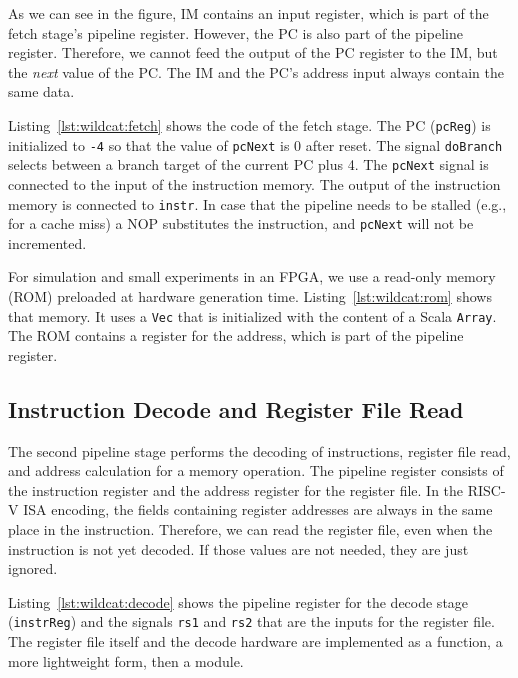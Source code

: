 \documentclass[%
    10pt,
    headinclude, footexclude,
    openright, %
    notitlepage,
    cleardoubleempty,
    headsepline,
    pointlessnumbers,
    bibtotoc, idxtotoc,
    ]{scrbook}
\newcommand{\code}[1]{{\lstinline[basicstyle=\small\ttfamily]{#1}}}
\begin{document}
As we can see in the figure, IM contains an input register, which is part of the fetch
stage's pipeline register. However, the PC is also part of the pipeline
register. Therefore, we cannot feed the output of the PC register to the IM,
but the \emph{next} value of the PC. The IM and the PC's address input always
contain the same data.


Listing~\ref{lst:wildcat:fetch} shows the code of the fetch stage. The PC (\code{pcReg})
is initialized to \code{-4} so that the value of \code{pcNext} is 0 after reset.
The signal \code{doBranch} selects between a branch target of the current PC plus 4.
The \code{pcNext} signal is connected to the input of the instruction memory.
The output of the instruction memory is connected to \code{instr}.
In case that the pipeline needs to be stalled (e.g., for a cache miss)
a NOP substitutes the instruction, and \code{pcNext} will not be incremented.


For simulation and small experiments in an FPGA, we use a read-only memory (ROM)
preloaded at hardware generation time. Listing~\ref{lst:wildcat:rom} shows that memory.
It uses a \code{Vec} that is initialized with the content of a Scala \code{Array}.
The ROM contains a register for the address, which is part of the pipeline register.

\subsection{Instruction Decode and Register File Read}

The second pipeline stage performs the decoding of instructions, register file read, and address
calculation for a memory operation. The pipeline register consists of the instruction register
and the address register for the register file. In the RISC-V ISA encoding, the fields containing
register addresses are always in the same place in the instruction. Therefore, we can 
read the register file, even when the instruction is not yet decoded. If those values
are not needed, they are just ignored.

Listing~\ref{lst:wildcat:decode} shows the pipeline register for the decode stage (\code{instrReg}) and
the signals \code{rs1} and \code{rs2} that are the inputs for the register file.
The register file itself and the decode hardware are implemented as a function, a more lightweight
form, then a module.
\end{document}
